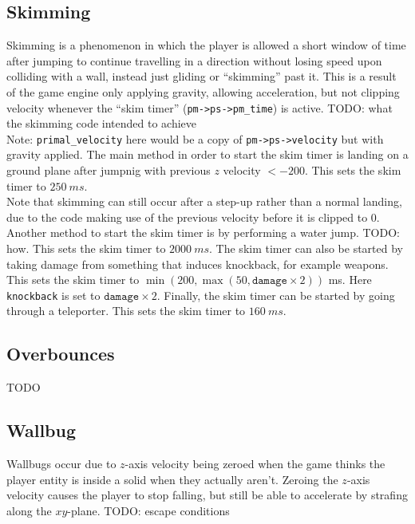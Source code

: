 \subsection{Skimming}
\label{sec:skimming}
Skimming is a phenomenon in which the player is allowed a short window of time after jumping to continue travelling in a direction without losing speed upon colliding with a wall, instead just gliding or ``skimming'' past it.
This is a result of the game engine only applying gravity, allowing acceleration, but not clipping velocity whenever the ``skim timer'' (\texttt{pm->ps->pm\_time}) is active.
TODO: what the skimming code intended to achieve\\
Note: \texttt{primal\_velocity} here would be a copy of \texttt{pm->ps->velocity} but with gravity applied.
The main method in order to start the skim timer is landing on a ground plane after jumpnig with previous $z$ velocity $< -200$.
This sets the skim timer to $\qty{250}{ms}$.\\
Note that skimming can still occur after a step-up rather than a normal landing, due to the code making use of the previous velocity before it is clipped to $0$.
Another method to start the skim timer is by performing a water jump. TODO: how.
This sets the skim timer to $\qty{2000}{ms}$.
The skim timer can also be started by taking damage from something that induces knockback, for example weapons.
This sets the skim timer to $\min(200, \max(50, \texttt{damage}\times2))$ ms. Here \texttt{knockback} is set to $\texttt{damage}\times2$.
Finally, the skim timer can be started by going through a teleporter.
This sets the skim timer to $\qty{160}{ms}$.


\subsection{Overbounces}
\label{sec:overbounce}
TODO%


\subsection{Wallbug}
\label{sec:wallbug}
Wallbugs occur due to $z$-axis velocity being zeroed when the game thinks the player entity is inside a solid when they actually aren't.
Zeroing the $z$-axis velocity causes the player to stop falling, but still be able to accelerate by strafing along the $xy$-plane.
TODO: escape conditions

